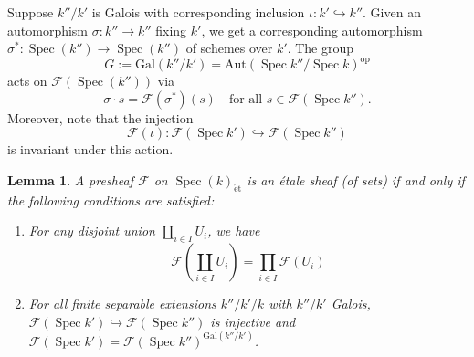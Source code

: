 \documentclass{article}
\def\~#1{\mathscr{#1}}
\numberwithin{equation}{section}
\numberwithin{figure}{section}
\newcommand{\Aut}{\mathrm{Aut}}
\newcommand{\mono}{\hookrightarrow}
\newcommand{\Spec}{\mathop{\mathrm{Spec}}}
\newcommand{\op}{\mathrm{op}}
\newcommand{\et}{\acute{\mathrm{e}}\mathrm{t}}
\newcommand{\Gal}{\mathrm{Gal}}
\theoremstyle{plain}
\newtheorem{lem}[thm]{Lemma}
\theoremstyle{definition}
\theoremstyle{remark}
\begin{document}
Suppose $k''/k'$ is Galois with corresponding inclusion $\iota: k' \mono k''$. Given an automorphism $\sigma: k'' \to k''$ fixing $k'$, we get a corresponding automorphism $\sigma^*: \Spec(k'') \to \Spec(k'')$ of schemes over $k'$. The group 
\[G := \Gal(k''/k') = \Aut(\Spec{k''}/\Spec{k})^\op\]
acts on $\~F(\Spec(k''))$ via 
\[\sigma \cdot s = \~F(\sigma^*)(s) \quad \text{for all } s \in \~F(\Spec{k''}).\]
Moreover, note that the injection
\[\~F(\iota) : \~F(\Spec{k'}) \mono \~F(\Spec{k''})\] 
is invariant under this action. 

\begin{lem}\label{lem:etSheaves_Speck}
    A presheaf $\~F$ on $\Spec(k)_{\et}$ is an \'etale sheaf (of sets) if and only if the following conditions are satisfied:
    \begin{enumerate}
        \item For any disjoint union $\coprod_{i \in I} U_i$, we have
        \[\~F\left(\coprod_{i \in I} U_i\right) = \prod_{i \in I} \~F(U_i)\]
        \item For all finite separable extensions $k''/k'/k$ with $k''/k'$ Galois, $\~F \left(\Spec{k'}\right) \mono \~F \left(\Spec{k''}\right)$ is injective and $\~F(\Spec{k'}) = \~F(\Spec{k''})^{\Gal(k''/k')}$.
    \end{enumerate}
\end{lem}
\end{document}
